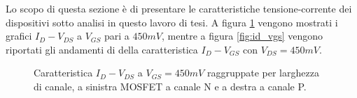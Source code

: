 Lo scopo di questa sezione è di presentare le caratteristiche tensione-corrente dei dispositivi sotto analisi in questo lavoro di tesi.
A figura \ref{fig:id_vds} vengono mostrati i grafici $I_{D} - V_{DS}$ a $V_{GS}$ pari a $450mV$, mentre a figura \ref{fig:id_vgs} vengono riportati gli andamenti di della caratteristica $I_D - V_{GS}$ con $V_{DS} = 450mV$.


\begin{figure}[ht]
    \centering
  
    \caption[Caratteristica $I_D - V_{DS}$ NMOS e PMOS]{Caratteristica $I_D - V_{DS}$ a $V_{GS} = 450mV$ raggruppate per larghezza di canale, a sinistra MOSFET a canale N e a destra a canale P.}
    \label{fig:id_vds}
  \end{figure}



